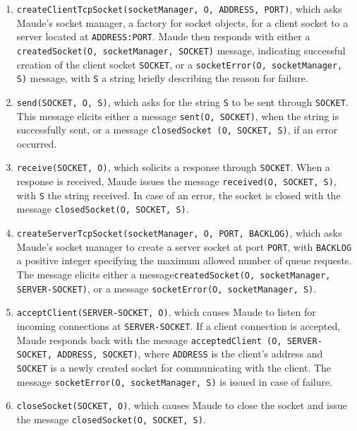 \documentclass{eptcs}
\begin{document}
\begin{enumerate}
\item \texttt{createClientTcpSocket(socketManager, O, ADDRESS, PORT)}, which asks Maude's socket manager, a factory for socket objects,  for a client socket to a server located at \texttt{ADDRESS:PORT}. Maude then responds with either a \texttt{createdSocket(O, socketManager, SOCKET)} message, indicating successful creation of the client socket \texttt{SOCKET}, or a \texttt{socketError(O, socketManager, S)} message, with \texttt{S} a string briefly describing the reason for failure.

\item \texttt{send(SOCKET, O, S)}, which asks for the string \texttt{S} to be sent through \texttt{SOCKET}. This message elicits either a message \texttt{sent(O, SOCKET)}, when the string is successfully sent, or a message \texttt{closedSocket (O, SOCKET, S)}, if an error occurred.	

\item \texttt{receive(SOCKET, O)}, which solicits a response through \texttt{SOCKET}. When a response is received, Maude issues the message \texttt{received(O, SOCKET, S)}, with \texttt{S} the string received. In case of an error, the socket is closed with the message \texttt{closedSocket(O, SOCKET, S)}.

\item \texttt{createServerTcpSocket(socketManager, O, PORT, BACKLOG)}, which asks Maude's socket manager to create a server socket at port \texttt{PORT}, with \texttt{BACKLOG} a positive integer specifying the maximum allowed number of queue requests. The message elicits either a message\texttt{createdSocket(O, socketManager, SERVER-SOCKET)}, or a message \texttt{socketError(O, socketManager, S)}.
 
\item \texttt{acceptClient(SERVER-SOCKET, O)}, which causes Maude to listen for incoming connections at \texttt{SERVER-SOCKET}. If a client connection is accepted, Maude responds back with the message \texttt{acceptedClient (O, SERVER-SOCKET, ADDRESS, SOCKET)}, where \texttt{ADDRESS} is the client's address and \texttt{SOCKET} is a newly created socket for communicating with the client. The message \texttt{socketError(O, socketManager, S)} is issued in case of failure.

\item \texttt{closeSocket(SOCKET, O)}, which causes Maude to close the socket and issue the message \texttt{closedSocket(O, SOCKET, S)}.

\end{enumerate}
\end{document}
